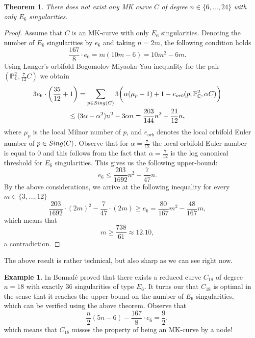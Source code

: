 \documentclass[11pt]{amsart}
\theoremstyle{plain}
\newtheorem{theorem}[thm]{Theorem}
\theoremstyle{definition}
\newtheorem{example}[thm]{Example}
\numberwithin{equation}{section}
\begin{document}
\begin{theorem}
\label{thmE6}
There does not exist any MK curve $C$ of degree $n \in \{6,...,24\}$ with only $E_{6}$ singularities.
\end{theorem}
\begin{proof}
Assume that $C$ is an MK-curve with only $E_{6}$ singularities.  Denoting the number of $E_{6}$ singularities by $e_{6}$ and taking $n=2m$, the following condition holds 
\begin{equation}
\frac{167}{8}\cdot e_{6}=m(10m-6) = 10m^{2}-6m.
\end{equation}
Using Langer's orbifold Bogomolov-Miyaoka-Yau inequality for the pair $(\mathbb{P}^{2}_{\mathbb{C}},\frac{7}{12}C)$ we obtain
\begin{gather*}
3e_{6}\cdot \bigg(\frac{35}{12}+1\bigg) = \sum_{p \in {\rm Sing}(C)}3\bigg(\alpha(\mu_{p}-1)+1 - e_{orb}(p, \mathbb{P}^{2}_{\mathbb{C}},\alpha C)\bigg) \\ \leq (3\alpha - \alpha^{2})n^{2} - 3\alpha n = \frac{203}{144}n^2 - \frac{21}{12}n,
\end{gather*}
where $\mu_{p}$ is the local Milnor number of $p$, and $e_{orb}$ denotes the local orbifold Euler number of $p \in {\rm Sing}(C)$. Observe that for $\alpha =\frac{7}{12}$ the local orbifold Euler number is equal to $0$ and this follows from the fact that $\alpha=\frac{7}{12}$ is the log canonical threshold for $E_{6}$ singularities. This gives us the following upper-bound:
\begin{equation}
e_{6}\leq \frac{203}{1692}n^{2}-\frac{7}{47}n.
\end{equation}
By the above considerations, we arrive at the following inequality for every $m\in \{3, ..., 12\}$
\begin{equation}
\frac{203}{1692}\cdot(2m)^{2}-\frac{7}{47}\cdot(2m) \geq e_{6} = \frac{80}{167}m^{2}-\frac{48}{167}m,
\end{equation}
which means that 
$$m\geq \frac{738}{61}\approx 12.10,$$
a contradiction.
\end{proof}
The above result is rather technical, but also sharp as we can see right now.
\begin{example}
\label{exB}
In \cite[Example 3.4]{Bonnafe} Bonnaf\'e proved that there exists a reduced curve $C_{18}$ of degree $n=18$ with exactly $36$ singularities of type $E_{6}$. It turns our that $C_{18}$ is optimal in the sense that it reaches the upper-bound on the number of $E_{6}$ singularities, which can be verified using the above theorem. Observe that
$$\frac{n}{2}(5n-6)- \frac{167}{8}\cdot e_{6} = \frac{9}{2},$$
which means that $C_{18}$ misses the property of being an MK-curve by a node!
\end{example}
\end{document}
